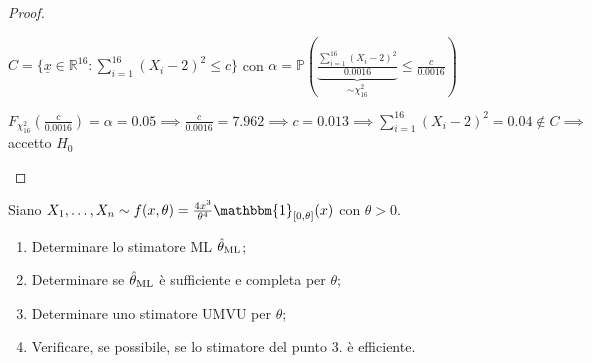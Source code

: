 \documentclass[hidelinks, 10pt]{report}
\begin{document}
\begin{proof}
\begin{enumerate}
$ C = \{ \underline{x} \in \mathbb{R}^{16} : \sum\limits_{i = 1}^{16} (X_{i} - 2)^{2} \le c \} $ con $  \alpha = \mathbb{P} \left( \underbrace{\frac{\sum\limits_{i = 1}^{16} (X_{i} - 2)^{2}}{0.0016}}_{\sim \chi^{2}_{16}} \le \frac{c}{0.0016} \right) $


$ F_{\chi^{2}_{16}} \left( \frac{c}{0.0016} \right) = \alpha = 0.05 \implies \frac{c}{0.0016} = 7.962 \implies c = 0.013 \implies \sum\limits_{i = 1}^{16} (X_{i} - 2)^{2} = 0.04 \not\in C \implies $ accetto $ H_{0} $
\end{enumerate}
\end{proof}

\begin{ex}
Siano $ X_{1}, \dotsc, X_{n} \sim f(x, \theta) = \frac{4 x^{3}}{\theta^{4}} \mathbbm{1}_{[0, \theta]} (x) $ con $ \theta > 0 $.

\begin{enumerate}
\item Determinare lo stimatore ML $ \hat{\theta}_{\text{ML}} $;
\item Determinare se $ \hat{\theta}_{\text{ML}} $ \`e sufficiente e completa per $ \theta $;
\item Determinare uno stimatore UMVU per $ \theta $;
\item Verificare, se possibile, se lo stimatore del punto 3. \`e efficiente.
\end{enumerate}
\end{ex}
\end{document}
